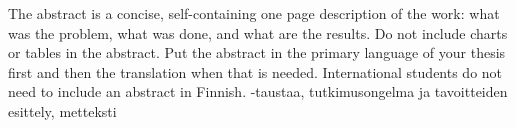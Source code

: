 The abstract is a concise, self-containing one page description of the work: what was the problem, what was done, and what are the results. Do not include charts or tables in the abstract. Put the abstract in the primary language of your thesis first and then the translation when that is needed. International students do not need to include an abstract in Finnish.
-taustaa, tutkimusongelma ja tavoitteiden esittely, metteksti